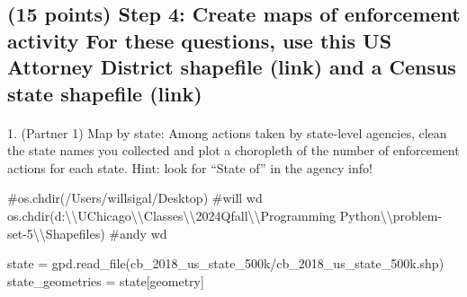 \documentclass[
  letterpaper,
  DIV=11,
  numbers=noendperiod]{scrartcl}
\makeatletter
\let\oldparagraph\paragraph
\renewcommand{\paragraph}{
    \@ifstar
      \xxxParagraphStar
      \xxxParagraphNoStar
  }
\newcommand{\xxxParagraphStar}[1]{\oldparagraph*{#1}\mbox{}}
\newcommand{\xxxParagraphNoStar}[1]{\oldparagraph{#1}\mbox{}}
\newenvironment{Shaded}{\begin{snugshade}}{\end{snugshade}}
\newcommand{\CharTok}[1]{\textcolor[rgb]{0.13,0.47,0.30}{#1}}
\newcommand{\CommentTok}[1]{\textcolor[rgb]{0.37,0.37,0.37}{#1}}
\newcommand{\NormalTok}[1]{\textcolor[rgb]{0.00,0.23,0.31}{#1}}
\newcommand{\OperatorTok}[1]{\textcolor[rgb]{0.37,0.37,0.37}{#1}}
\newcommand{\StringTok}[1]{\textcolor[rgb]{0.13,0.47,0.30}{#1}}
\makeatother
\begin{document}
\subsection{(15 points) Step 4: Create maps of enforcement activity For
these questions, use this US Attorney District shapefile (link) and a
Census state shapefile
(link)}\label{points-step-4-create-maps-of-enforcement-activity-for-these-questions-use-this-us-attorney-district-shapefile-link-and-a-census-state-shapefile-link}

\paragraph{1. (Partner 1) Map by state: Among actions taken by
state-level agencies, clean the state names you collected and plot a
choropleth of the number of enforcement actions for each state. Hint:
look for ``State of'' in the agency
info!}\label{partner-1-map-by-state-among-actions-taken-by-state-level-agencies-clean-the-state-names-you-collected-and-plot-a-choropleth-of-the-number-of-enforcement-actions-for-each-state.-hint-look-for-state-of-in-the-agency-info}

\begin{Shaded}
\begin{Highlighting}[]
\CommentTok{\#os.chdir(\textquotesingle{}/Users/willsigal/Desktop\textquotesingle{}) \#will wd}
\NormalTok{os.chdir(}\StringTok{\textquotesingle{}d:}\CharTok{\textbackslash{}\textbackslash{}}\StringTok{UChicago}\CharTok{\textbackslash{}\textbackslash{}}\StringTok{Classes}\CharTok{\textbackslash{}\textbackslash{}}\StringTok{2024Qfall}\CharTok{\textbackslash{}\textbackslash{}}\StringTok{Programming Python}\CharTok{\textbackslash{}\textbackslash{}}\StringTok{problem{-}set{-}5}\CharTok{\textbackslash{}\textbackslash{}}\StringTok{Shapefiles\textquotesingle{}}\NormalTok{) }\CommentTok{\#andy wd}

\NormalTok{state }\OperatorTok{=}\NormalTok{ gpd.read\_file(}\StringTok{\textquotesingle{}cb\_2018\_us\_state\_500k/cb\_2018\_us\_state\_500k.shp\textquotesingle{}}\NormalTok{)}
\NormalTok{state\_geometries }\OperatorTok{=}\NormalTok{ state[}\StringTok{\textquotesingle{}geometry\textquotesingle{}}\NormalTok{]}
\end{Highlighting}
\end{Shaded}
\end{document}
